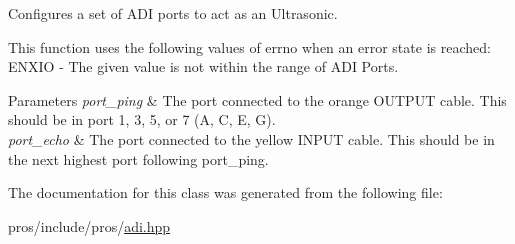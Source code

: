Configures a set of A\+DI ports to act as an Ultrasonic.

This function uses the following values of errno when an error state is reached\+: E\+N\+X\+IO -\/ The given value is not within the range of A\+DI Ports.


\begin{DoxyParams}{Parameters}
{\em port\+\_\+ping} & The port connected to the orange O\+U\+T\+P\+UT cable. This should be in port 1, 3, 5, or 7 (\textquotesingle{}A\textquotesingle{}, \textquotesingle{}C\textquotesingle{}, \textquotesingle{}E\textquotesingle{}, \textquotesingle{}G\textquotesingle{}). \\
\hline
{\em port\+\_\+echo} & The port connected to the yellow I\+N\+P\+UT cable. This should be in the next highest port following port\+\_\+ping. \\
\hline
\end{DoxyParams}


The documentation for this class was generated from the following file\+:\begin{DoxyCompactItemize}
\item 
pros/include/pros/\hyperlink{adi_8hpp}{adi.\+hpp}\end{DoxyCompactItemize}
